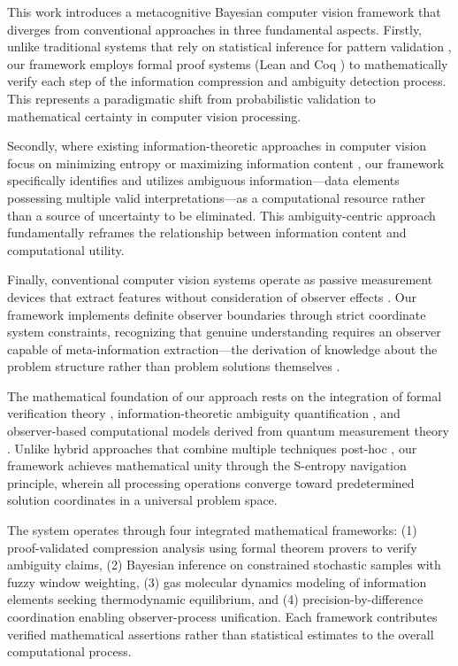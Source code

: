 \documentclass[11pt,a4paper]{article}
\begin{document}
This work introduces a metacognitive Bayesian computer vision framework that diverges from conventional approaches in three fundamental aspects. Firstly, unlike traditional systems that rely on statistical inference for pattern validation \cite{bishop2006pattern, murphy2012machine}, our framework employs formal proof systems (Lean \cite{moura2015lean} and Coq \cite{bertot2013interactive}) to mathematically verify each step of the information compression and ambiguity detection process. This represents a paradigmatic shift from probabilistic validation to mathematical certainty in computer vision processing.

Secondly, where existing information-theoretic approaches in computer vision focus on minimizing entropy or maximizing information content \cite{cover2006elements, mackay2003information}, our framework specifically identifies and utilizes ambiguous information—data elements possessing multiple valid interpretations—as a computational resource rather than a source of uncertainty to be eliminated. This ambiguity-centric approach fundamentally reframes the relationship between information content and computational utility.

Finally, conventional computer vision systems operate as passive measurement devices that extract features without consideration of observer effects \cite{ballard1991animate, aloimonos1988active}. Our framework implements definite observer boundaries through strict coordinate system constraints, recognizing that genuine understanding requires an observer capable of meta-information extraction—the derivation of knowledge about the problem structure rather than problem solutions themselves \cite{hofstadter2007strange}.

The mathematical foundation of our approach rests on the integration of formal verification theory \cite{harrison2009handbook}, information-theoretic ambiguity quantification \cite{shannon1948mathematical}, and observer-based computational models derived from quantum measurement theory \cite{wheeler1983quantum, zurek2003decoherence}. Unlike hybrid approaches that combine multiple techniques post-hoc \cite{ensemble2012zhou}, our framework achieves mathematical unity through the S-entropy navigation principle, wherein all processing operations converge toward predetermined solution coordinates in a universal problem space.

The system operates through four integrated mathematical frameworks: (1) proof-validated compression analysis using formal theorem provers to verify ambiguity claims, (2) Bayesian inference on constrained stochastic samples with fuzzy window weighting, (3) gas molecular dynamics modeling of information elements seeking thermodynamic equilibrium, and (4) precision-by-difference coordination enabling observer-process unification. Each framework contributes verified mathematical assertions rather than statistical estimates to the overall computational process.
\end{document}
